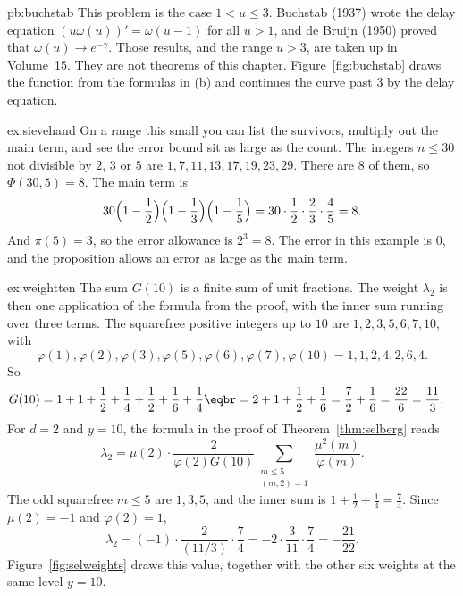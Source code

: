 \begin{solution}{pb:buchstab}
\leads This problem is the case $1<u\le3$. Buchstab (1937) wrote the delay equation $(u\omega(u))'=\omega(u-1)$ for all $u>1$, and de Bruijn (1950) proved that $\omega(u)\to e^{-\gamma}$. Those results, and the range $u>3$, are taken up in Volume~15. They are not theorems of this chapter. Figure~\ref{fig:buchstab} draws the function from the formulas in (b) and continues the curve past $3$ by the delay equation.
\end{solution}

\begin{solution}{ex:sievehand}
\idea On a range this small you can list the survivors, multiply out the main term, and see the error bound sit as large as the count.
\writeup The integers $n\le30$ not divisible by $2$, $3$ or $5$ are $1,7,11,13,17,19,23,29$. There are $8$ of them, so $\Phi(30,5)=8$. The main term is
\[
30\Bigl(1-\frac12\Bigr)\Bigl(1-\frac13\Bigr)\Bigl(1-\frac15\Bigr)=30\cdot\frac12\cdot\frac23\cdot\frac45=8.
\]
And $\pi(5)=3$, so the error allowance is $2^3=8$. The error in this example is $0$, and the proposition allows an error as large as the main term.
\end{solution}

\begin{solution}{ex:weightten}
\idea The sum $G(10)$ is a finite sum of unit fractions. The weight $\lambda_2$ is then one application of the formula from the proof, with the inner sum running over three terms.
\writeup The squarefree positive integers up to $10$ are $1,2,3,5,6,7,10$, with
\[
\varphi(1),\varphi(2),\varphi(3),\varphi(5),\varphi(6),\varphi(7),\varphi(10)=1,1,2,4,2,6,4.
\]
So
\[
\begin{aligned}G(10)&=1+1+\frac12+\frac14+\frac12+\frac16+\frac14\eqbr=2+1+\frac12+\frac16=\frac72+\frac16=\frac{22}6=\frac{11}3.\end{aligned}
\]
For $d=2$ and $y=10$, the formula in the proof of Theorem~\ref{thm:selberg} reads
\[
\lambda_2=\mu(2)\cdot\frac{2}{\varphi(2)G(10)}\sum_{\substack{m\le5\\(m,2)=1}}\frac{\mu^2(m)}{\varphi(m)}.
\]
The odd squarefree $m\le5$ are $1,3,5$, and the inner sum is $1+\frac12+\frac14=\frac74$. Since $\mu(2)=-1$ and $\varphi(2)=1$,
\[
\lambda_2=(-1)\cdot\frac{2}{(11/3)}\cdot\frac74=-2\cdot\frac3{11}\cdot\frac74=-\frac{21}{22}.
\]
Figure~\ref{fig:selweights} draws this value, together with the other six weights at the same level $y=10$.
\end{solution}

